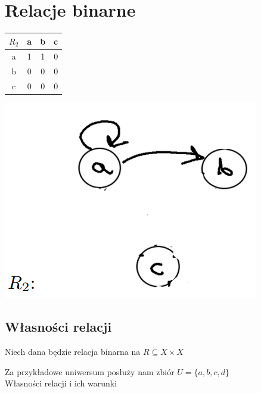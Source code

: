 \section{Relacje binarne}

\begin{table}[h]
    \centering
    \begin{tabular}{|c|c|c|c|}
    \hline
    $R_2$ & a & b & c \\ \hline
    a & 1 & 1 & 0 \\ \hline
    b & 0 & 0 & 0 \\ \hline
    c & 0 & 0 & 0 \\ \hline
    \end{tabular}
\end{table}

\includegraphics[scale=0.5]{img/grafR2.png}

\subsection{Własności relacji}

Niech dana będzie relacja binarna na $ R \subseteq X \times X $

Za przykładowe uniwersum posłuży nam zbiór $U = \{ a, b, c, d \} $ \\

Własności relacji i ich warunki

